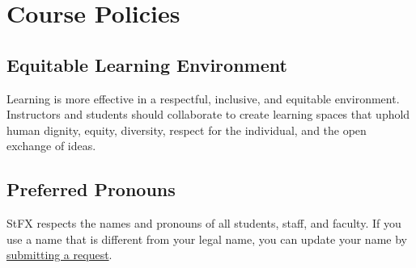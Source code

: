 \documentclass[12pt]{article}
\begin{document}
\section*{Course Policies}

\subsection*{Equitable Learning Environment}

Learning is more effective in a respectful, inclusive, and equitable environment. Instructors and students should collaborate to create learning spaces that uphold human dignity, equity, diversity, respect for the individual, and the open exchange of ideas.

\subsection*{Preferred Pronouns}

StFX respects the names and pronouns of all students, staff, and faculty. If you use a name that is different from your legal name, you can update your name by \href{https://stfx.teamdynamix.com/TDClient/1764/Portal/Requests/Service/39840/Change-of-Name}{submitting a request}.
\end{document}
